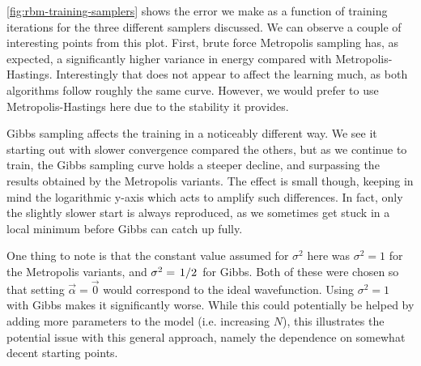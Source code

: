 \documentclass[a4paper, 11pt]{article}
\begin{document}
\begin{multicols}{2}


    \autoref{fig:rbm-training-samplers} shows the error we make as a function of
    training iterations for the three different samplers discussed. We can
    observe a couple of interesting points from this plot. First, brute force
    Metropolis sampling has, as expected, a significantly higher variance in
    energy compared with Metropolis-Hastings. Interestingly that does not appear
    to affect the learning much, as both algorithms follow roughly the same
    curve. However, we would prefer to use Metropolis-Hastings here due to the
    stability it provides. 

    Gibbs sampling affects the training in a noticeably different way. We see it
    starting out with slower convergence compared the others, but as we continue
    to train, the Gibbs sampling curve holds a steeper decline, and surpassing
    the results obtained by the Metropolis variants. The effect is small though,
    keeping in mind the logarithmic y-axis which acts to amplify such
    differences. In fact, only the slightly slower start is always reproduced,
    as we sometimes get stuck in a local minimum before Gibbs can catch up
    fully.

    One thing to note is that the constant value assumed for $\sigma^2$ here was
    $\sigma^2=1$ for the Metropolis variants, and $\sigma^2=\flatfrac{1}{2}$ for
    Gibbs. Both of these were chosen so that setting $\vec\alpha=\vec 0$ would
    correspond to the ideal wavefunction. Using $\sigma^2=1$ with Gibbs makes it
    significantly worse. While this could potentially be helped by adding more
    parameters to the model (i.e. increasing $N$), this illustrates the
    potential issue with this general approach, namely the dependence on
    somewhat decent starting points.


\end{multicols}
\end{document}
